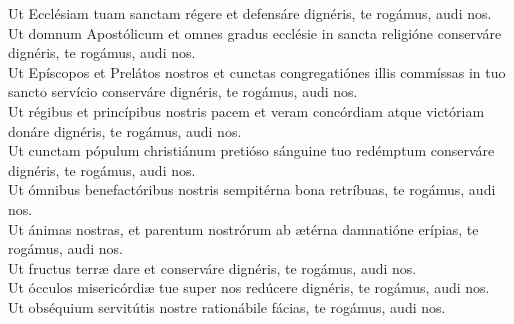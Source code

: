 {	%
		Ut Ecclésiam tuam sanctam régere et defensáre dignéris, te rogámus, audi nos. \\
		Ut domnum Apostólicum et omnes gradus ecclésie in sancta religióne conserváre dignéris, te rogámus, audi nos. \\
		Ut Epíscopos et Prelátos nostros et cunctas congregatiónes illis commíssas in tuo sancto servício conserváre dignéris, te rogámus, audi nos. \\
		Ut régibus et princípibus nostris pacem et veram concórdiam atque victóriam donáre dignéris, te rogámus, audi nos. \\
		Ut cunctam pópulum christiánum pretióso sánguine tuo redémptum conserváre dignéris, te rogámus, audi nos. \\
	Ut ómnibus benefactóribus nostris sempitérna bona retríbuas, te rogámus, audi nos. \\
		Ut ánimas nostras, et parentum nostrórum ab ætérna damnatióne erípias, te rogámus, audi nos. \\
	Ut fructus terræ dare et conserváre dignéris, te rogámus, audi nos. \\
		Ut ócculos misericórdiæ tue super nos redúcere dignéris, te rogámus, audi nos. \\
		Ut obséquium servitútis nostre rationábile fácias, te rogámus, audi nos. \\
}

